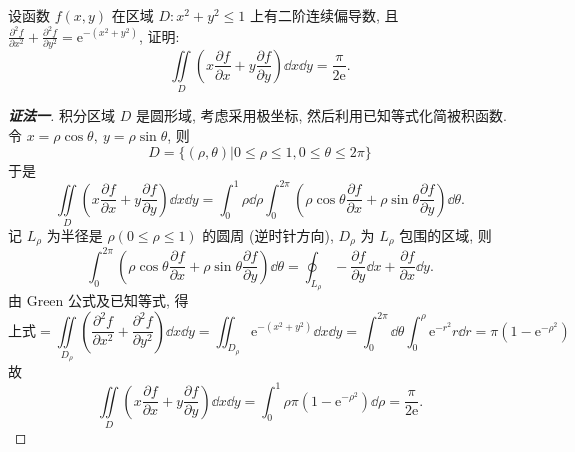 \begin{example}
    设函数 $f(x,y)$ 在区域 $D:x^2+y^2\leqslant  1$ 上有二阶连续偏导数, 
    且 $\displaystyle\frac{\partial^2f}{\partial x^2}+\frac{\partial^2f}{\partial y^2}=\mathrm{e}^{-\left(x^2+y^2\right)}$, 证明:
    $$\iint\limits_D\left(x\frac{\partial f}{\partial x}+y\frac{\partial f}{\partial y}\right)\dd x\dd y=\frac{\pi}{2\mathrm{e}}.$$
\end{example}
\begin{proof}[{\songti \textbf{证法一}}]
    积分区域 $D$ 是圆形域, 考虑采用极坐标, 然后利用已知等式化简被积函数.
    令 $x=\rho\cos\theta,~y=\rho\sin\theta$, 则$$D=\{(\rho,\theta)|0\leqslant \rho\le1,0\leqslant \theta\le2\pi\}$$ 于是
    $$\iint\limits_D\left(x\frac{\partial f}{\partial x}+y\frac{\partial f}{\partial y}\right)\dd x\dd y=\int_0^1\rho\dd \rho\int_0^{2\pi}\left(\rho\cos\theta\frac{\partial f}{\partial x}+\rho\sin\theta\frac{\partial f}{\partial y}\right)\dd \theta.$$
    记 $L_\rho$ 为半径是 $\rho\left(0\leqslant \rho\leqslant  1\right)$ 的圆周 (逆时针方向), $D_\rho$ 为 $L_\rho$ 包围的区域, 则
    $$\int_0^{2\pi}\left(\rho\cos\theta\frac{\partial f}{\partial x}+\rho\sin\theta\frac{\partial f}{\partial y}\right)\dd \theta=\oint_{L_\rho}-\frac{\partial f}{\partial y}\dd x+\frac{\partial f}{\partial x}\dd y.$$
    由 Green 公式及已知等式, 得
    $$\text{上式}=\iint\limits_{D_\rho}\left(\frac{\partial^2f}{\partial x^2}+\frac{\partial ^2f}{\partial y^2}\right)\dd x\dd y=\iint_{D_\rho}\mathrm{e}^{-\left(x^2+y^2\right)}\dd x\dd y=\int_0^{2\pi}\dd \theta\int_0^\rho\mathrm{e}^{-r^2}r\dd r=\pi\left(1-\mathrm{e}^{-\rho^2}\right)$$
    故 $$\iint\limits_D\left(x\frac{\partial f}{\partial x}+y\frac{\partial f}{\partial y}\right)\dd x\dd y=\int_0^1\rho\pi\left(1-\mathrm{e}^{-\rho^2}\right)\dd \rho=\frac{\pi}{2\mathrm{e}}.$$
\end{proof}
